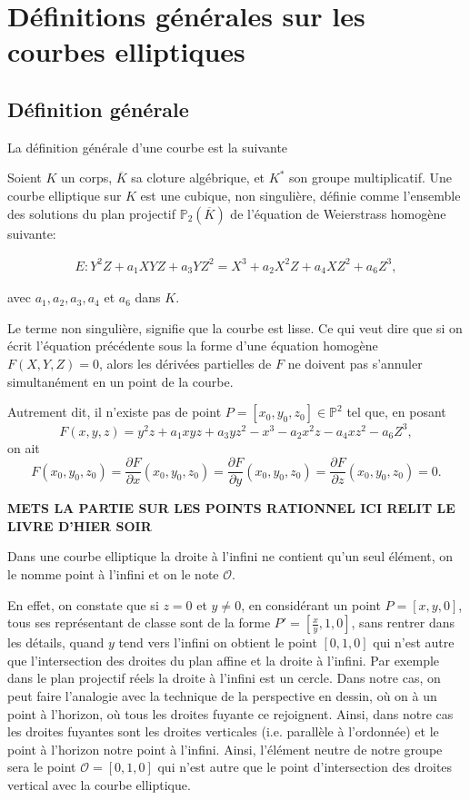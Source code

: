 \chapter{Définitions générales sur les courbes elliptiques}

\section{Définition générale}

La définition générale d'une courbe est la suivante
\begin{definition}
    Soient $K$ un corps, $\overline{K}$ sa cloture algébrique, et $K^{*}$ son groupe
    multiplicatif. Une courbe elliptique sur $K$ est une cubique, non singulière,
    définie comme l'ensemble des solutions du plan projectif $\mathbb{P}_{2}(\overline{K})$ de
    l'équation de Weierstrass homogène suivante:

\begin{align}
\label{eq:geneEll}
E: Y^2Z+a_1XYZ+a_3YZ^2 = X^3 +a_2X^2Z+a_4XZ^2+a_6Z^3
,\end{align}

avec $a_1,a_2,a_3,a_4$ et $a_6$ dans $K$.
\end{definition}
Le terme non singulière, signifie que la courbe est lisse. Ce qui veut dire que si on écrit
l'équation précédente sous la forme d'une équation homogène $F(X,Y,Z)=0$, alors les dérivées
partielles de $F$ ne doivent pas s'annuler simultanément en un point de la courbe.

Autrement dit, il n'existe pas de point $P = \left[ x_0,y_0,z_0 \right] \in \mathbb{P}^2$ tel
que, en posant
\[
F(x,y,z) = y^2z+a_1xyz+a_3yz^2 - x^3-a_2x^2z-a_4xz^2-a_6Z^3
,\] 
on ait
\[
F(x_0,y_0,z_0)=\frac{\partial{F}}{\partial{x}}(x_0,y_0,z_0) =
\frac{\partial{F}}{\partial{y}}(x_0,y_0,z_0) =
\frac{\partial{F}}{\partial{z}}(x_0,y_0,z_0) = 0
.\] 

\textbf{METS LA PARTIE SUR LES POINTS RATIONNEL ICI RELIT LE LIVRE D'HIER SOIR}

Dans une courbe elliptique la droite à l'infini ne contient qu'un seul élément, on le nomme
point à l'infini et on le note $\mathcal{O}$.

En effet, on constate
que si $z = 0$ et $y \neq 0$, en considérant un point $P=[x,y,0]$, tous ses représentant de
classe sont de la forme $P'=[\frac{x}{y},1,0]$, sans rentrer dans les détails, quand $y$ tend
vers l'infini on obtient le point $[0,1,0]$ qui n'est autre que l'intersection des droites du
plan affine et la droite à l'infini. Par exemple dans le plan projectif réels la droite à
l'infini est un cercle. Dans notre cas, on peut faire l'analogie avec la technique de
la perspective en dessin, où on à un point à l'horizon, où tous les droites fuyante ce rejoignent. Ainsi,
dans notre cas les droites fuyantes sont les droites verticales (i.e. parallèle à l'ordonnée) et le
point à l'horizon notre point à l'infini. Ainsi, l'élément neutre de notre groupe sera le point
$\mathcal{O} = [0,1,0]$ qui n'est autre que le point d'intersection des droites
vertical avec la courbe elliptique.

